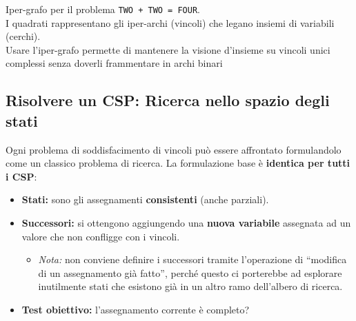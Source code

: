 \documentclass[a4paper,11pt]{report}
\begin{document}
\begin{gframe}{}
\begin{center}

{\footnotesize Iper-grafo per il problema \texttt{TWO + TWO = FOUR}.\\
I quadrati rappresentano gli iper-archi (vincoli) che legano insiemi di variabili (cerchi).\\
Usare l'iper-grafo permette di mantenere la visione d'insieme su vincoli unici complessi senza doverli frammentare in archi binari}
\end{center}
\end{gframe}

\subsection{Risolvere un CSP: Ricerca nello spazio degli stati}
Ogni problema di soddisfacimento di vincoli può essere affrontato formulandolo come un classico problema di ricerca. La formulazione base è \textbf{identica per tutti i CSP}:

\begin{itemize}
    \item \textbf{Stati:} sono gli assegnamenti \textbf{consistenti} (anche parziali).
    \item \textbf{Successori:} si ottengono aggiungendo una \textbf{nuova variabile} assegnata ad un valore che non confligge con i vincoli.
    \begin{itemize}
        \item \textit{Nota:} non conviene definire i successori tramite l'operazione di ``modifica di un assegnamento già fatto'', perché questo ci porterebbe ad esplorare inutilmente stati che esistono già in un altro ramo dell'albero di ricerca.
    \end{itemize}
    \item \textbf{Test obiettivo:} l'assegnamento corrente è completo?
\end{itemize}
\end{document}
